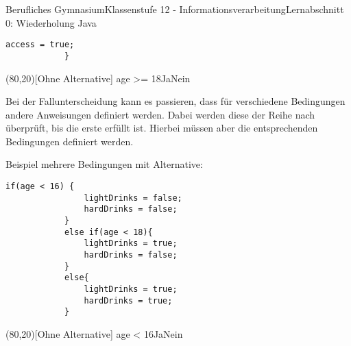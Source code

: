 \documentclass[11pt,oneside,openany,headings=optiontotoc,11pt,numbers=noenddot]{article}
\begin{document}
\begin{worksheet}{Berufliches Gymnasium}{Klassenstufe 12 - Informationsverarbeitung}{Lernabschnitt 0: Wiederholung Java}
\begin{minipage}[t]{0.48\textwidth}
\begin{lstlisting}[style=JavaInputStyle,frame=single]
				access = true;
			}
			\end{lstlisting}
		\end{minipage}
		\hfill
		\begin{minipage}[t]{0.48\textwidth}
			\vspace*{0pt}
			\begin{struktogramm}(80,20)[Ohne Alternative]
				{age >= 18}{Ja}{Nein}
				\change
				\ifend
			\end{struktogramm}
		\end{minipage}
		\par\noindent
		Bei der Fallunterscheidung kann es passieren, dass für verschiedene Bedingungen andere Anweisungen definiert werden. Dabei werden diese der Reihe nach überprüft, bis die erste erfüllt ist. Hierbei müssen aber die entsprechenden Bedingungen definiert werden.
		\par\noindent
		\begin{minipage}[t]{0.48\textwidth}
			\vspace*{0pt}
			Beispiel mehrere Bedingungen mit Alternative:
			\begin{lstlisting}[style=JavaInputStyle,frame=single]
			if(age < 16) {
				lightDrinks = false;
				hardDrinks = false;
			}
			else if(age < 18){
				lightDrinks = true;
				hardDrinks = false;
			}
			else{
				lightDrinks = true;
				hardDrinks = true;
			}
			\end{lstlisting}
		\end{minipage}
		\hfill
		\begin{minipage}[t]{0.48\textwidth}
			\vspace*{0pt}
			\begin{struktogramm}(80,20)[Ohne Alternative]
				{age < 16}{Ja}{Nein}
				\change
				\change
				\ifend
				\ifend
			\end{struktogramm}
		\end{minipage}

\end{worksheet}
\end{document}
